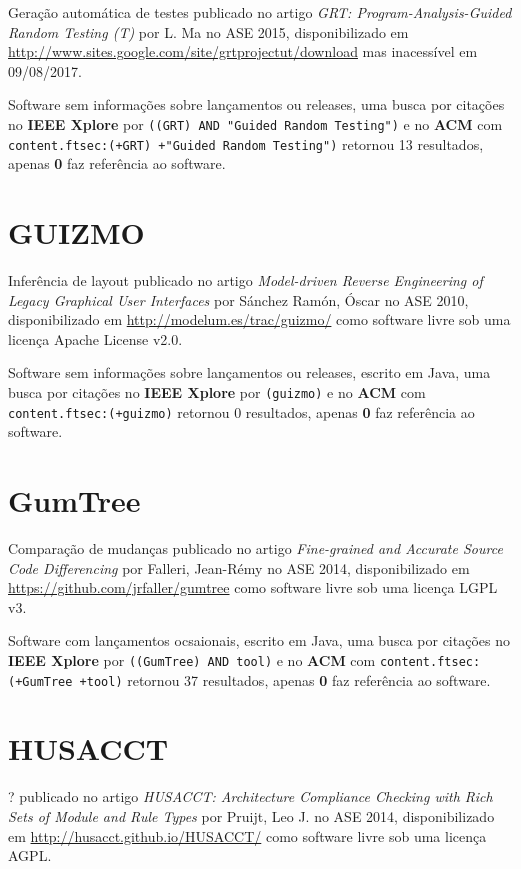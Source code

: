 Geração automática de testes
publicado no artigo {\it GRT: Program-Analysis-Guided Random Testing (T)}
por L. Ma
no ASE 2015,
disponibilizado em \url{http://www.sites.google.com/site/grtprojectut/download}
mas inacessível em 09/08/2017.

Software sem informações sobre lançamentos ou releases,
uma busca por citações no {\bf IEEE Xplore} por
\texttt{((GRT) AND "Guided Random Testing")}
e no {\bf ACM} com
\texttt{content.ftsec:(+GRT) +"Guided Random Testing")}
retornou
13 resultados, apenas
{\bf 0} faz referência ao software.



\section{GUIZMO}

Inferência de layout
publicado no artigo {\it Model-driven Reverse Engineering of Legacy Graphical User Interfaces}
por S\'{a}nchez Ram\'{o}n, \'{O}scar
no ASE 2010,
disponibilizado em \url{http://modelum.es/trac/guizmo/}
como software livre
sob uma licença Apache License v2.0.

Software sem informações sobre lançamentos ou releases,
escrito em Java,
uma busca por citações no {\bf IEEE Xplore} por
\texttt{(guizmo)}
e no {\bf ACM} com
\texttt{content.ftsec:(+guizmo)}
retornou
0 resultados, apenas
{\bf 0} faz referência ao software.



\section{GumTree}

Comparação de mudanças
publicado no artigo {\it Fine-grained and Accurate Source Code Differencing}
por Falleri, Jean-R{\'e}my
no ASE 2014,
disponibilizado em \url{https://github.com/jrfaller/gumtree}
como software livre
sob uma licença LGPL v3.

Software com lançamentos ocsaionais,
escrito em Java,
uma busca por citações no {\bf IEEE Xplore} por
\texttt{((GumTree) AND tool)}
e no {\bf ACM} com
\texttt{content.ftsec:(+GumTree +tool)}
retornou
37 resultados, apenas
{\bf 0} faz referência ao software.



\section{HUSACCT}

?
publicado no artigo {\it HUSACCT: Architecture Compliance Checking with Rich Sets of Module and Rule Types}
por Pruijt, Leo J.
no ASE 2014,
disponibilizado em \url{http://husacct.github.io/HUSACCT/}
como software livre
sob uma licença AGPL.

